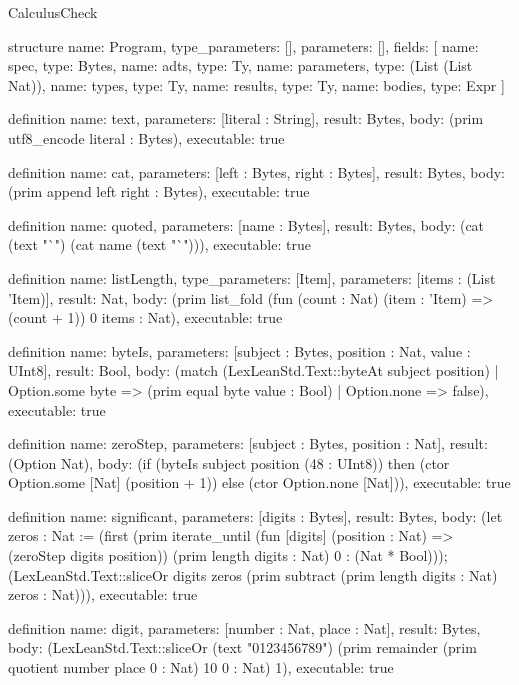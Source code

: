 \begin{lexlean}{CalculusCheck}
\begin{semanticmodule}
structure{
  name: Program,
  type_parameters: [],
  parameters: [],
  fields: [
    {name: spec, type: Bytes},
    {name: adts, type: Ty},
    {name: parameters, type: (List (List Nat))},
    {name: types, type: Ty},
    {name: results, type: Ty},
    {name: bodies, type: Expr}
  ]
}

definition{
  name: text,
  parameters: [literal : String],
  result: Bytes,
  body: (prim utf8_encode literal : Bytes),
  executable: true
}

definition{
  name: cat,
  parameters: [left : Bytes, right : Bytes],
  result: Bytes,
  body: (prim append left right : Bytes),
  executable: true
}

definition{
  name: quoted,
  parameters: [name : Bytes],
  result: Bytes,
  body: (cat (text "`") (cat name (text "`"))),
  executable: true
}

definition{
  name: listLength,
  type_parameters: [Item],
  parameters: [items : (List 'Item)],
  result: Nat,
  body: (prim list_fold (fun (count : Nat) (item : 'Item) => (count + 1)) 0 items : Nat),
  executable: true
}

definition{
  name: byteIs,
  parameters: [subject : Bytes, position : Nat, value : UInt8],
  result: Bool,
  body: (match (LexLeanStd.Text::byteAt subject position)
    | Option.some byte => (prim equal byte value : Bool)
    | Option.none => false),
  executable: true
}

definition{
  name: zeroStep,
  parameters: [subject : Bytes, position : Nat],
  result: (Option Nat),
  body: (if (byteIs subject position (48 : UInt8)) then (ctor Option.some [Nat] (position + 1)) else (ctor Option.none [Nat])),
  executable: true
}

definition{
  name: significant,
  parameters: [digits : Bytes],
  result: Bytes,
  body: (let zeros : Nat := (first (prim iterate_until (fun [digits] (position : Nat) => (zeroStep digits position)) (prim length digits : Nat) 0 : (Nat * Bool))); (LexLeanStd.Text::sliceOr digits zeros (prim subtract (prim length digits : Nat) zeros : Nat))),
  executable: true
}

definition{
  name: digit,
  parameters: [number : Nat, place : Nat],
  result: Bytes,
  body: (LexLeanStd.Text::sliceOr (text "0123456789") (prim remainder (prim quotient number place 0 : Nat) 10 0 : Nat) 1),
  executable: true
}


\end{semanticmodule}
\end{lexlean}
